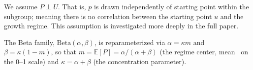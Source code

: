 \documentclass[10pt]{article}
\newlength{\fnlabelwidth}
\newcommand{\fnline}[2]{%
  \par\noindent
  \makebox[\fnlabelwidth][l]{$^{#1}$}%
  \parbox[t]{\dimexpr\linewidth-\fnlabelwidth\relax}{#2}%
  \par
}
\begin{document}
\begin{minipage}[t]{15.2in}
\vspace{4pt}
\fnline{5}{We assume $P\perp U$. That is, $p$ is drawn independently of starting point within the subgroup; meaning there is no correlation between the starting point $u$ and the growth regime. This assumption is investigated more deeply in the full paper.}

\vspace{4pt}
\fnline{6}{The Beta family, $\mathrm{Beta}(\alpha, \beta)$, is reparameterized via $\alpha = \kappa m$ and $\beta = \kappa(1-m)$, so that $m = \mathbb{E}[P] = \alpha / (\alpha + \beta)$ (the regime center, mean \SGPc~on the 0--1 scale) and $\kappa = \alpha + \beta$ (the concentration parameter).}

\end{minipage}
\end{document}
